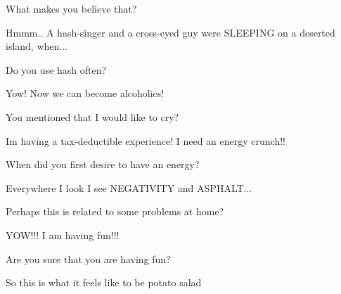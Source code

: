 \documentclass[cropmarks, frame, english]{idamasterthesis}
\begin{document}
What makes you believe that?

Hmmm..  A hash-singer and a cross-eyed guy were SLEEPING on a deserted
 island, when...

Do you use hash often?

Yow!  Now we can become alcoholics!

You mentioned that I would like to cry?

Im having a tax-deductible experience!  I need an energy crunch!!

When did you first desire to have an energy?

Everywhere I look I see NEGATIVITY and ASPHALT...

Perhaps this is related to some problems at home?

YOW!!!  I am having fun!!!

Are you sure that you are having fun?

So this is what it feels like to be potato salad
\end{document}
